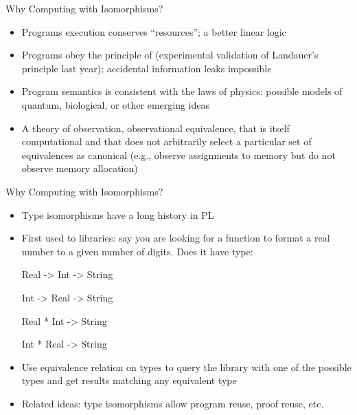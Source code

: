 \documentclass[11pt]{beamer}
\newcommand{\red}[1]{{\color{red}{#1}}}
\newcommand{\blue}[1]{{\color{blue}{#1}}}
\begin{document}
\begin{frame}{Why Computing with Isomorphisms?}

\begin{itemize}

\vfill\item Programs execution conserves ``resources''; a better linear logic

\vfill\item Programs obey the principle of \red{conservation of information}
(experimental validation of Landauer's principle last year); accidental
information leaks impossible

\vfill\item Program semantics is consistent with the laws of physics:
possible models of quantum, biological, or other emerging ideas

\vfill\item A theory of observation, observational equivalence, that is
itself computational and that does not arbitrarily select a particular set of
equivalences as canonical (e.g., observe assignments to memory but do not
observe memory allocation)

\end{itemize}

\vfill

\end{frame}

\begin{frame}{Why Computing with Isomorphisms?}

\begin{itemize}

\vfill\item Type isomorphisms have a long history in PL

\vfill\item First used to \blue{search} libraries: say you are looking for a
function to format a real number to a given number of digits. Does it have type:

{{ Real -> Int -> String}}

{{ Int -> Real -> String}}

{{ Real * Int -> String}}

{{ Int * Real -> String}}

\vfill\item Use equivalence relation on types to query the library with one
of the possible types and get results matching any equivalent type

\vfill\item Related ideas: type isomorphisms allow program reuse, proof
reuse, etc.

\end{itemize}

\vfill

\end{frame}
\end{document}
